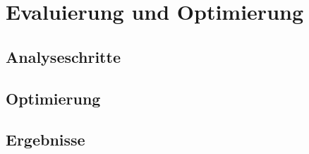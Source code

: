 \chapter{Evaluierung und Optimierung}

\section{Analyseschritte}

\section{Optimierung}

\section{Ergebnisse}